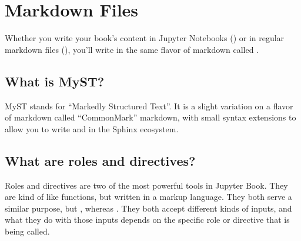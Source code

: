 \documentclass[letterpaper,10pt,english]{sphinxmanual}
\begin{document}
\begin{sphinxVerbatim}[commandchars=\\\{\}]
   
   
   

  
      
\end{sphinxVerbatim}


\chapter{Markdown Files}
\label{\detokenize{Part1/markdown:markdown-files}}\label{\detokenize{Part1/markdown::doc}}
Whether you write your book’s content in Jupyter Notebooks () or
in regular markdown files (), you’ll write in the same flavor of markdown
called .


\section{What is MyST?}
\label{\detokenize{Part1/markdown:what-is-myst}}
MyST stands for “Markedly Structured Text”. It
is a slight variation on a flavor of markdown called “CommonMark” markdown,
with small syntax extensions to allow you to write  and 
in the Sphinx ecosystem.


\section{What are roles and directives?}
\label{\detokenize{Part1/markdown:what-are-roles-and-directives}}
Roles and directives are two of the most powerful tools in Jupyter Book. They
are kind of like functions, but written in a markup language. They both
serve a similar purpose, but , whereas
. They both accept different kinds of inputs,
and what they do with those inputs depends on the specific role or directive
that is being called.
\end{document}
